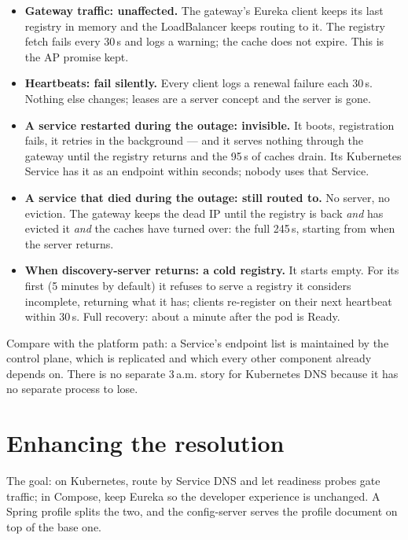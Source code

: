 \begin{itemize}
  \item \textbf{Gateway traffic: unaffected.} The gateway's Eureka client
  keeps its last registry in memory and the LoadBalancer keeps routing
  to it. The registry fetch fails every 30\,s and logs a warning; the
  cache does not expire. This is the AP promise kept.
  \item \textbf{Heartbeats: fail silently.} Every client logs a renewal
  failure each 30\,s. Nothing else changes; leases are a server concept
  and the server is gone.
  \item \textbf{A service restarted during the outage: invisible.} It
  boots, registration fails, it retries in the background --- and it
  serves nothing through the gateway until the registry returns and the
  95\,s of caches drain. Its Kubernetes Service has it as an endpoint
  within seconds; nobody uses that Service.
  \item \textbf{A service that died during the outage: still routed to.}
  No server, no eviction. The gateway keeps the dead IP until the
  registry is back \emph{and} has evicted it \emph{and} the caches have
  turned over: the full 245\,s, starting from when the server returns.
  \item \textbf{When discovery-server returns: a cold registry.} It
  starts empty. For its first 
  (5 minutes by default) it refuses to serve a registry it considers
  incomplete, returning what it has; clients re-register on their next
  heartbeat within 30\,s. Full recovery: about a minute after the pod is
  Ready.
\end{itemize}

Compare with the platform path: a Service's endpoint list is maintained
by the control plane, which is replicated and which every other
component already depends on. There is no separate 3\,a.m. story for
Kubernetes DNS because it has no separate process to lose.

\section{Enhancing the resolution}
\label{sec:discovery-enhance}

The goal: on Kubernetes, route by Service DNS and let readiness probes
gate traffic; in Compose, keep Eureka so the developer experience is
unchanged. A Spring profile splits the two, and the config-server serves
the profile document on top of the base one.

